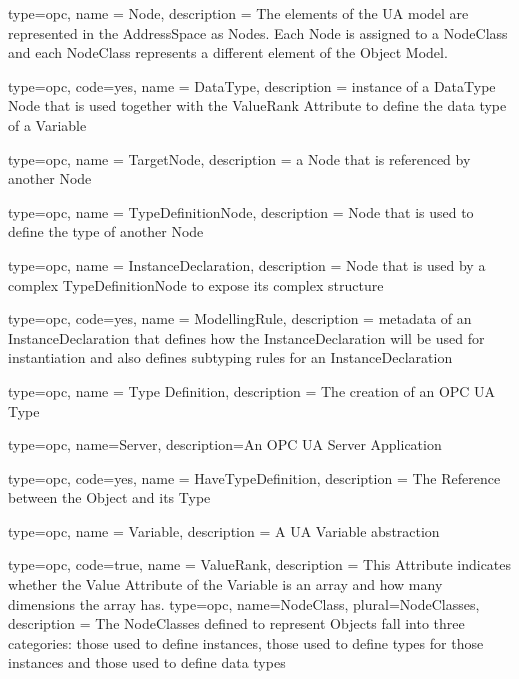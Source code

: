 


{
  type=opc,
  name = {Node},
  description = {The elements of the UA model are represented in the AddressSpace as Nodes. Each Node is assigned to a NodeClass and each NodeClass represents a different element of the Object Model.}
}

{
  type=opc,
  code=yes,
  name = {DataType},
  description = {instance of a DataType Node that is used together with the ValueRank Attribute to define the data type of a Variable}
}

{
  type=opc,
  name = {TargetNode},
  description = {a Node that is referenced by another Node}
}

{
  type=opc,
  name = {TypeDefinitionNode},
  description = {Node that is used to define the type of another Node}
}


{
  type=opc,
  name = {InstanceDeclaration},
  description = {Node that is used by a complex \gls{TypeDefinitionNode} to expose its complex structure}
}

{
  type=opc,
  code=yes,
  name = {ModellingRule},
  description = {metadata of an InstanceDeclaration that defines how the \gls{InstanceDeclaration} will be used for instantiation and also defines subtyping rules for an \gls{InstanceDeclaration}}
}

{
  type=opc,
  name = {Type Definition},
  description = {The creation of an OPC UA Type}
}

{
  type=opc,
  name=Server,
  description={An OPC UA Server Application}
}

{
  type=opc,
  code=yes,
  name = {HaveTypeDefinition},
  description = {The \gls{Reference} between the \gls{Object} and its \gls{Type}}
}

{
  type=opc,
  name = {Variable},
  description = {A UA Variable abstraction}
}

{
  type=opc,
  code=true,
  name = {ValueRank},
  description = {This Attribute indicates whether the Value Attribute of the Variable is an array and how many dimensions the array has.}
}
{
  type=opc,
  name=NodeClass,
  plural=NodeClasses,
  description = {The NodeClasses defined to represent Objects fall into three categories: those used to define instances, those used to define types for those instances and those used to define data types}
}

